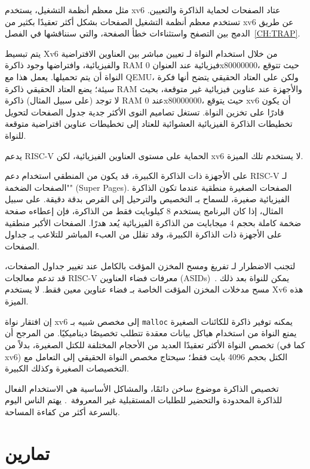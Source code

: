 مثل معظم أنظمة التشغيل، يستخدم xv6 عتاد الصفحات لحماية الذاكرة والتعيين.
تستخدم معظم أنظمة التشغيل الصفحات بشكل أكثر تعقيدًا بكثير من xv6 عن طريق الدمج بين التصفح واستثناءات خطأ الصفحة، والتي سنناقشها في الفصل~\ref{CH:TRAP}.

يتم تبسيط Xv6 من خلال استخدام النواة لـ تعيين مباشر بين العناوين الافتراضية والفيزيائية، وافتراضها وجود ذاكرة RAM فيزيائية عند العنوان 0x80000000، حيث تتوقع النواة أن يتم تحميلها.
يعمل هذا مع QEMU، ولكن على العتاد الحقيقي يتضح أنها فكرة سيئة؛
يضع العتاد الحقيقي ذاكرة RAM والأجهزة عند عناوين فيزيائية غير متوقعة، بحيث لا توجد (على سبيل المثال) ذاكرة RAM عند 0x80000000، حيث يتوقع xv6 أن يكون قادرًا على تخزين النواة.
تستغل تصاميم النوى الأكثر جدية جدول الصفحات لتحويل تخطيطات الذاكرة الفيزيائية العشوائية للعتاد إلى تخطيطات عناوين افتراضية متوقعة للنواة.

يدعم RISC-V الحماية على مستوى العناوين الفيزيائية، لكن xv6 لا يستخدم تلك الميزة.

على الأجهزة ذات الذاكرة الكبيرة، قد يكون من المنطقي استخدام دعم RISC-V لـ "الصفحات الضخمة" (Super Pages).
الصفحات الصغيرة منطقية عندما تكون الذاكرة الفيزيائية صغيرة، للسماح بـ التخصيص والترحيل إلى القرص بدقة دقيقة.
على سبيل المثال، إذا كان البرنامج يستخدم 8 كيلوبايت فقط من الذاكرة، فإن إعطاءه صفحة ضخمة كاملة بحجم 4 ميجابايت من الذاكرة الفيزيائية يُعد هدرًا.
الصفحات الأكبر منطقية على الأجهزة ذات الذاكرة الكبيرة، وقد تقلل من العبء المباشر للتلاعب بـ جداول الصفحات.

لتجنب الاضطرار لـ تفريغ ومسح المخزن المؤقت بالكامل عند تغيير جداول الصفحات، قد تدعم معالجات RISC-V معرفات فضاء العناوين (ASIDs)~\cite{riscv:priv}.
يمكن للنواة بعد ذلك مسح مدخلات المخزن المؤقت الخاصة بـ فضاء عناوين معين فقط. لا يستخدم Xv6 هذه الميزة.

إن افتقار نواة xv6 إلى مخصص شبيه بـ {\tt malloc} يمكنه توفير ذاكرة للكائنات الصغيرة يمنع النواة من استخدام هياكل بيانات معقدة تتطلب تخصيصًا ديناميكيًا.
من المرجح أن تخصص النواة الأكثر تعقيدًا العديد من الأحجام المختلفة للكتل الصغيرة، بدلاً من (كما في xv6) الكتل بحجم 4096 بايت فقط؛
سيحتاج مخصص النواة الحقيقي إلى التعامل مع التخصيصات الصغيرة وكذلك الكبيرة.

تخصيص الذاكرة موضوع ساخن دائمًا، والمشاكل الأساسية هي الاستخدام الفعال للذاكرة المحدودة والتحضير للطلبات المستقبلية غير المعروفة~\cite{knuth}.
يهتم الناس اليوم بالسرعة أكثر من كفاءة المساحة.

\section{تمارين}
\label{sec:exercises_mem}

